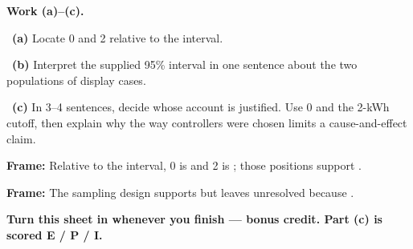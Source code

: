 \documentclass[11pt]{article}
\begin{document}
\newpage
\textbf{Work (a)--(c).}\par\smallskip

~\textbf{(a)} Locate 0 and 2 relative to the interval.\par
\workspace{0.7in}

~\textbf{(b)} Interpret the supplied 95\% interval in one sentence about the two populations of display cases.\par
\workspace{1.4in}

~\textbf{(c)} In 3--4 sentences, decide whose account is justified. Use 0 and the 2-kWh cutoff, then explain why the way controllers were chosen limits a cause-and-effect claim.\par
\workspace{2.0in}

\begin{sentenceframebox}\raggedright\textbf{Frame:} Relative to the interval, 0 is \blank[0.9in] and 2 is \blank[0.9in]; those positions support \blank[2.4in].\end{sentenceframebox}

\begin{sentenceframebox}\raggedright\textbf{Frame:} The sampling design supports \blank[2.0in] but leaves \blank[1.8in] unresolved because \blank[1.8in].\end{sentenceframebox}

\textbf{Turn this sheet in whenever you finish --- bonus credit. Part (c) is scored E / P / I.}\par
\end{document}
